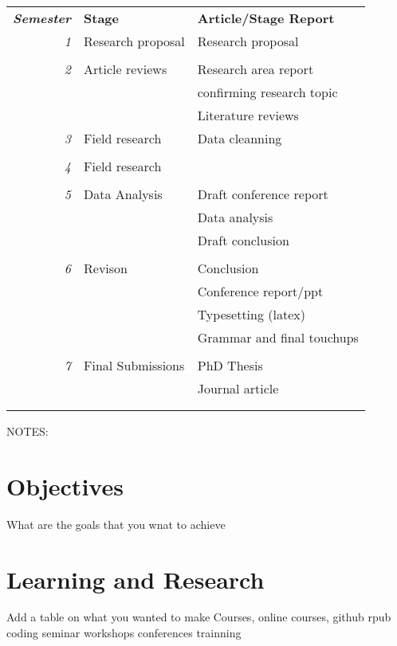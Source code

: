 \documentclass[12pt, twoside]{article}
\begin{document}
\begin{tabular}{r|p{5cm}p{7cm}}
	
	\emph{\textbf{Semester}}& \textbf{Stage} & \textbf{Article/Stage Report}\\
	
	\emph{1} & Research proposal & Research proposal \\
	&&\\
	\emph{2} & Article reviews & Research area report\\
	&&\footnotesize{\hspace{0.5cm}confirming research topic}\\
	&& Literature reviews\\
	
	\emph{3} & Field research & Data cleanning\\
	&&\\
	
	\emph{4} & Field research & \\
	&&\\
	
	\emph{5} & Data Analysis & Draft conference report\\
	&& Data analysis\\
	&& Draft conclusion\\
	&&\\	
	\emph{6} & Revison & Conclusion\\
	&& Conference report/ppt\\
	&& Typesetting (latex)\\
	&& Grammar and final touchups\\
	&&\\
	
	\emph{7} & Final Submissions & PhD Thesis  \\
	&&Journal article\\
	
	\\\multicolumn{2}{c}{} 
\end{tabular}
\newline
\footnotesize{NOTES: }
\section{Objectives}
What are the goals that you wnat to achieve
\section{Learning and Research}
Add a table on what you wanted to make
Courses, online courses, github rpub coding
seminar
workshops
conferences
trainning
\end{document}
